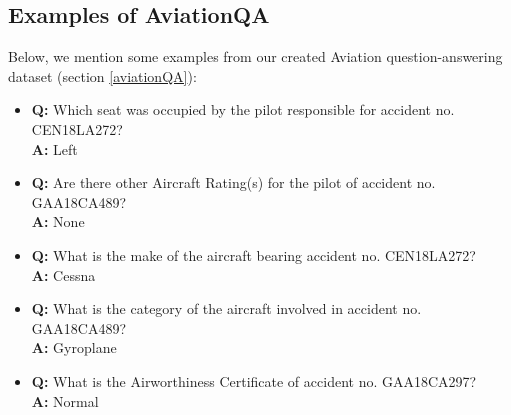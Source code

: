 \documentclass[11pt]{article}
\begin{document}
\subsection{Examples of AviationQA}
Below, we mention some examples from our created Aviation question-answering dataset (section \ref{aviationQA}):
\begin{itemize}
    \item \textbf{Q:} Which seat was occupied by the pilot responsible for accident no. CEN18LA272?\\	\textbf{A:} Left
    
    \item \textbf{Q:} Are there other Aircraft Rating(s) for the pilot of accident no. GAA18CA489?\\
    \textbf{A:} None
    
    \item \textbf{Q:} What is the make of the aircraft bearing accident no. CEN18LA272?	\\
    \textbf{A:} Cessna
    
    \item \textbf{Q:} What is the category of the aircraft involved in accident no. GAA18CA489?\\	\textbf{A:} Gyroplane
    
    \item \textbf{Q:} What is the Airworthiness Certificate of accident no. GAA18CA297?\\	\textbf{A:} Normal
\end{itemize}
\end{document}
